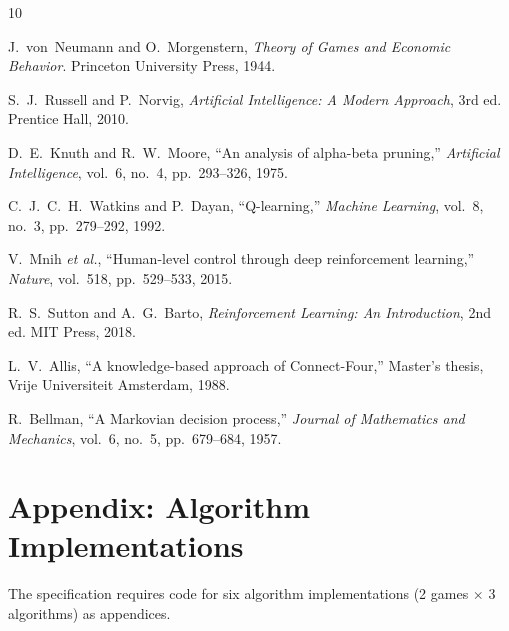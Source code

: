 \documentclass[12pt, a4paper]{article}
\begin{document}
\newpage
\begin{thebibliography}{10}

J.~von~Neumann and O.~Morgenstern, \textit{Theory of Games and Economic Behavior}.
Princeton University Press, 1944.

S.~J.~Russell and P.~Norvig, \textit{Artificial Intelligence: A Modern Approach},
3rd ed. Prentice Hall, 2010.

D.~E.~Knuth and R.~W.~Moore,
``An analysis of alpha-beta pruning,''
\textit{Artificial Intelligence}, vol.~6, no.~4, pp.~293--326, 1975.

C.~J.~C.~H.~Watkins and P.~Dayan,
``Q-learning,''
\textit{Machine Learning}, vol.~8, no.~3, pp.~279--292, 1992.

V.~Mnih \textit{et al.},
``Human-level control through deep reinforcement learning,''
\textit{Nature}, vol.~518, pp.~529--533, 2015.

R.~S.~Sutton and A.~G.~Barto, \textit{Reinforcement Learning: An Introduction},
2nd ed. MIT Press, 2018.

L.~V.~Allis,
``A knowledge-based approach of Connect-Four,''
Master's thesis, Vrije Universiteit Amsterdam, 1988.

R.~Bellman, ``A Markovian decision process,''
\textit{Journal of Mathematics and Mechanics}, vol.~6, no.~5, pp.~679--684, 1957.

\end{thebibliography}


\newpage
\appendix
\section{Appendix: Algorithm Implementations}
\label{sec:appendix}

The specification requires code for six algorithm implementations (2 games $\times$ 3
algorithms) as appendices.
\end{document}
